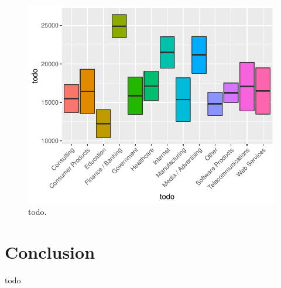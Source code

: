 \documentclass{article}
\begin{document}
\begin{figure}[H]
\centering
\includegraphics{report-046}
\caption{todo.}\label{fig_14}
\end{figure}

\section{Conclusion}
todo
\end{document}
